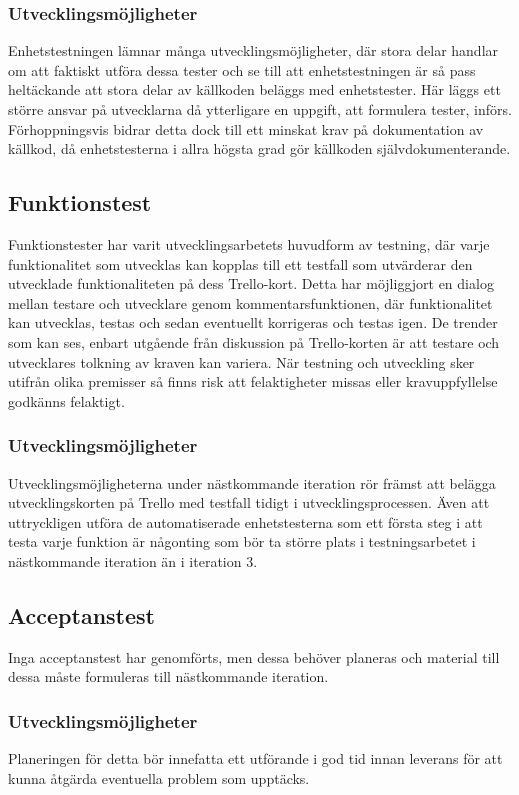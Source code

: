 \subsubsection{Utvecklingsmöjligheter}
Enhetstestningen lämnar många utvecklingsmöjligheter, där stora delar handlar om att faktiskt utföra dessa tester och se till att enhetstestningen är så pass heltäckande att stora delar av källkoden beläggs med enhetstester. Här läggs ett större ansvar på utvecklarna då ytterligare en uppgift, att formulera tester, införs. Förhoppningsvis bidrar detta dock till ett minskat krav på dokumentation av källkod, då enhetstesterna i allra högsta grad gör källkoden självdokumenterande.
\subsection{Funktionstest}
Funktionstester har varit utvecklingsarbetets huvudform av testning, där varje funktionalitet som utvecklas kan kopplas till ett testfall som utvärderar den utvecklade funktionaliteten på dess Trello-kort. Detta har möjliggjort en dialog mellan testare och utvecklare genom kommentarsfunktionen, där funktionalitet kan utvecklas, testas och sedan eventuellt korrigeras och testas igen. De trender som kan ses, enbart utgående från diskussion på Trello-korten är att testare och utvecklares tolkning av kraven kan variera. När testning och utveckling sker utifrån olika premisser så finns risk att felaktigheter missas eller kravuppfyllelse godkänns felaktigt.
\subsubsection{Utvecklingsmöjligheter}
Utvecklingsmöjligheterna under nästkommande iteration rör främst att belägga utvecklingskorten på Trello med testfall tidigt i utvecklingsprocessen. Även att uttryckligen utföra de automatiserade enhetstesterna som ett första steg i att testa varje funktion är någonting som bör ta större plats i testningsarbetet i nästkommande iteration än i iteration 3. 
\subsection{Acceptanstest}
Inga acceptanstest har genomförts, men dessa behöver planeras och material till dessa måste formuleras till nästkommande iteration.
\subsubsection{Utvecklingsmöjligheter}
Planeringen för detta bör innefatta ett utförande i god tid innan leverans för att kunna åtgärda eventuella problem som upptäcks.
